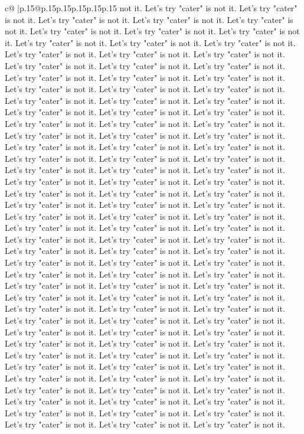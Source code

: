 \documentclass{article}
\begin{document}
{\begin{supertabular}{c@{$\;$}|p{.15\linewidth}@{}p{.15\linewidth}p{.15\linewidth}p{.15\linewidth}p{.15\linewidth}p{.15\linewidth}}
{{{not it. Let's try "cater" is not it. Let's try "cater" is not it. Let's try "cater" is not it. Let's try "cater" is not it. Let's try "cater" is not it. Let's try "cater" is not it. Let's try "cater" is not it. Let's try "cater" is not it. Let's try "cater" is not it. Let's try "cater" is not it. Let's try "cater" is not it. Let's try "cater" is not it. Let's try "cater" is not it. Let's try "cater" is not it. Let's try "cater" is not it. Let's try "cater" is not it. Let's try "cater" is not it. Let's try "cater" is not it. Let's try "cater" is not it. Let's try "cater" is not it. Let's try "cater" is not it. Let's try "cater" is not it. Let's try "cater" is not it. Let's try "cater" is not it. Let's try "cater" is not it. Let's try "cater" is not it. Let's try "cater" is not it. Let's try "cater" is not it. Let's try "cater" is not it. Let's try "cater" is not it. Let's try "cater" is not it. Let's try "cater" is not it. Let's try "cater" is not it. Let's try "cater" is not it. Let's try "cater" is not it. Let's try "cater" is not it. Let's try "cater" is not it. Let's try "cater" is not it. Let's try "cater" is not it. Let's try "cater" is not it. Let's try "cater" is not it. Let's try "cater" is not it. Let's try "cater" is not it. Let's try "cater" is not it. Let's try "cater" is not it. Let's try "cater" is not it. Let's try "cater" is not it. Let's try "cater" is not it. Let's try "cater" is not it. Let's try "cater" is not it. Let's try "cater" is not it. Let's try "cater" is not it. Let's try "cater" is not it. Let's try "cater" is not it. Let's try "cater" is not it. Let's try "cater" is not it. Let's try "cater" is not it. Let's try "cater" is not it. Let's try "cater" is not it. Let's try "cater" is not it. Let's try "cater" is not it. Let's try "cater" is not it. Let's try "cater" is not it. Let's try "cater" is not it. Let's try "cater" is not it. Let's try "cater" is not it. Let's try "cater" is not it. Let's try "cater" is not it. Let's try "cater" is not it. Let's try "cater" is not it. Let's try "cater" is not it. Let's try "cater" is not it. Let's try "cater" is not it. Let's try "cater" is not it. Let's try "cater" is not it. Let's try "cater" is not it. Let's try "cater" is not it. Let's try "cater" is not it. Let's try "cater" is not it. Let's try "cater" is not it. Let's try "cater" is not it. Let's try "cater" is not it. Let's try "cater" is not it. Let's try "cater" is not it. Let's try "cater" is not it. Let's try "cater" is not it. Let's try "cater" is not it. Let's try "cater" is not it. Let's try "cater" is not it. Let's try "cater" is not it. Let's try "cater" is not it. Let's try "cater" is not it. Let's try "cater" is not it. Let's try "cater" is not it. Let's try "cater" is not it. Let's try "cater" is not it. Let's try "cater" is not it. Let's try "cater" is not it. Let's try "cater" is not it. Let's try "cater" is not it. Let's try "cater" is not it. Let's try "cater" is not it. Let's try "cater" is not it. Let's try "cater" is not it. Let's try "cater" is not it. Let's try "cater" is not it. Let's try "cater" is not it. Let's try "cater" is not it. Let's try "cater" is not it. Let's try "cater" is not it. }}}
\end{supertabular}}
\end{document}
